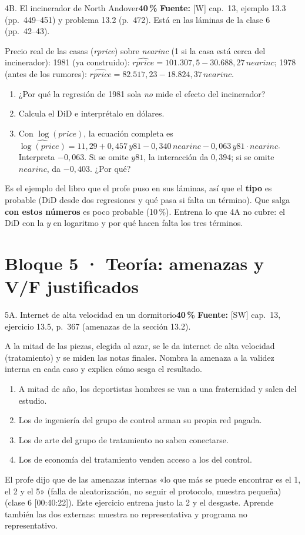 \documentclass[11pt]{article}
\newcommand{\prob}[1]{\colorbox{red!15}{\textbf{#1}}}
\newcommand{\fuente}[1]{{\small\textcolor{blue!50!black}{\textbf{Fuente:} #1}}\par}
\newcommand{\bloque}[2]{\section*{Bloque #1 · #2}}
\begin{document}
\begin{ej}{4B. El incinerador de North Andover}{\prob{40\,\%}}
\fuente{[W] cap.~13, ejemplo 13.3 (pp.~449--451) y problema 13.2 (p.~472). Está en las láminas de la clase 6 (pp.~42--43).}
Precio real de las casas (\emph{rprice}) sobre \emph{nearinc} (1 si la casa está cerca del incinerador):
1981 (ya construido): $\widehat{rprice}=101.307{,}5-30.688{,}27\,nearinc$; 1978 (antes de los rumores): $\widehat{rprice}=82.517{,}23-18.824{,}37\,nearinc$.
\begin{enumerate}[label=\alph*),itemsep=0pt,topsep=2pt]
\item ¿Por qué la regresión de 1981 sola \emph{no} mide el efecto del incinerador?
\item Calcula el DiD e interprétalo en dólares.
\item Con $\log(price)$, la ecuación completa es $\widehat{\log(price)}=11{,}29+0{,}457\,y81-0{,}340\,nearinc-0{,}063\,y81\cdot nearinc$. Interpreta $-0{,}063$. Si se omite $y81$, la interacción da $0{,}394$; si se omite $nearinc$, da $-0{,}403$. ¿Por qué?
\end{enumerate}
\end{ej}
\begin{porque}
Es el ejemplo del libro que el profe puso en sus láminas, así que el \textbf{tipo} es probable (DiD desde dos regresiones y qué pasa si falta un término). Que salga \textbf{con estos números} es poco probable (10\,\%). Entrena lo que 4A no cubre: el DiD con la $y$ en logaritmo y por qué hacen falta los tres términos.
\end{porque}

\bloque{5}{Teoría: amenazas y V/F justificados}

\begin{ej}{5A. Internet de alta velocidad en un dormitorio}{\prob{40\,\%}}
\fuente{[SW] cap.~13, ejercicio 13.5, p.~367 (amenazas de la sección 13.2).}
A la mitad de las piezas, elegida al azar, se le da internet de alta velocidad (tratamiento) y se miden las notas finales. Nombra la amenaza a la validez interna en cada caso y explica cómo sesga el resultado.
\begin{enumerate}[label=\alph*),itemsep=0pt,topsep=2pt]
\item A mitad de año, los deportistas hombres se van a una fraternidad y salen del estudio.
\item Los de ingeniería del grupo de control arman su propia red pagada.
\item Los de arte del grupo de tratamiento no saben conectarse.
\item Los de economía del tratamiento venden acceso a los del control.
\end{enumerate}
\end{ej}
\begin{porque}
El profe dijo que de las amenazas internas «lo que más se puede encontrar es el 1, el 2 y el 5» (falla de aleatorización, no seguir el protocolo, muestra pequeña) (clase 6 [00:40:22]). Este ejercicio entrena justo la 2 y el desgaste. Aprende también las dos externas: muestra no representativa y programa no representativo.
\end{porque}
\end{document}
